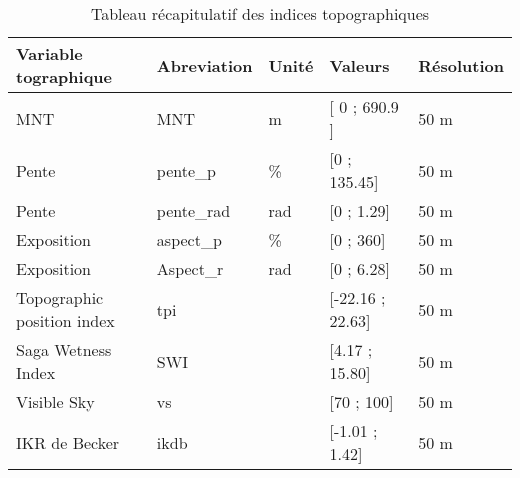 \begin{table}[htbp]
\caption{Tableau récapitulatif des indices topographiques}
\label{tableabrute}
\begin{tabular}{|l|l|l|l|l|}
\hline
\textbf{Variable tographique}              & \textbf{Abreviation} & \textbf{Unité} & \textbf{Valeurs} & \textbf{Résolution}   \\ \hline
MNT                          & MNT                  & m              & [ 0 ; 690.9 ]        & 50 m    \\ \hline
Pente                        & pente\_p             & \%             & [0 ; 135.45]       & 50 m     \\ \hline
Pente                        & pente\_rad           & rad            & [0 ; 1.29]        & 50 m   \\ \hline
Exposition                   & aspect\_p            & \%             & [0 ; 360]         & 50 m    \\ \hline
Exposition                   & Aspect\_r            & rad            & [0 ; 6.28]        & 50 m   \\ \hline
Topographic   position index & tpi                  &                & [-22.16 ; 22.63]   & 50 m    \\ \hline
Saga Wetness   Index         & SWI                  &                & [4.17 ; 15.80]     & 50 m    \\ \hline
Visible Sky                  & vs                   &                & [70 ; 100]          & 50 m   \\ \hline
IKR de Becker                & ikdb                 &                & [-1.01 ; 1.42]     & 50 m    \\ \hline


\end{tabular}
\end{table}
 
